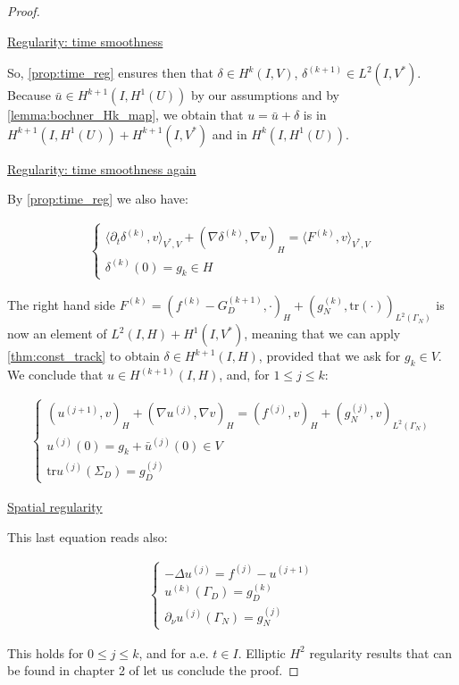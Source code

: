 \documentclass[english,a4paper,10pt,oneside]{scrbook}	%
\theoremstyle{break}
\newenvironment{mproof}[1][\proofname]{%
  \begin{proof}[#1]$ $\par\nobreak\ignorespaces
}{%
  \end{proof}
}
\renewcommand*{\proofname}{Proof}
\theoremstyle{remark}
\newcommand{\tr}{\text{tr}}
\begin{document}
\begin{appendices}
\begin{mproof}
\underline{Regularity: time smoothness}

So, \cref{prop:time_reg} ensures then that $\delta \in H^k(I,V)$, $\delta^{(k+1)} \in L^2(I,V^*)$. Because $\bar{u} \in H^{k+1}(I,H^1(U))$ by our assumptions and by \cref{lemma:bochner_Hk_map}, we obtain that $u = \bar{u} + \delta$ is in $H^{k+1}(I,H^1(U)) + H^{k+1}(I,V^*)$ and in $H^k(I,H^{1}(U))$.

\underline{Regularity: time smoothness again}

By \cref{prop:time_reg} we also have:

\begin{align*}
\left\{\begin{matrix}
\langle \partial_t \delta^{(k)},v\rangle_{V^*,V} + (\nabla \delta^{(k)}, \nabla v)_H = \langle F^{(k)}, v\rangle_{V^*,V} \\
\delta^{(k)}(0) = g_k \in H
\end{matrix}\right.
\end{align*}

The right hand side $F^{(k)} = (f^{(k)} - G^{(k+1)}_D, \cdot)_H +(g_N^{(k)}, \tr(\cdot))_{L^2(\Gamma_N)}$ is now an element of $L^2(I,H) + H^1(I,V^*)$, meaning that we can apply \cref{thm:const_track} to obtain $\delta \in H^{k+1}(I,H)$, provided that we ask for $g_k \in V$.
We conclude that $u \in H^{(k+1)}(I,H)$, and, for $1\leq j \leq k$:

\begin{align*}
	\left\{\begin{matrix}
(u^{(j+1)},v)_H + (\nabla u^{(j)}, \nabla v)_H = ( f^{(j)}, v)_H + (g_N^{(j)}, v)_{L^2(\Gamma_N)} \\
u^{(j)}(0) = g_k + \bar{u}^{(j)}(0)  \in V \\
\tr u^{(j)}(\Sigma_D) = g_D^{(j)}
\end{matrix}\right.
\end{align*}

\underline{Spatial regularity}

This last equation reads also:

\begin{align*}
\left\{\begin{matrix}
- \Delta  u^{(j)} = f^{(j)} - u^{(j+1)} \\
u^{(k)}(\Gamma_D) = g_D^{(k)} \\
\partial_\nu u^{(j)}(\Gamma_N) = g_N^{(j)}
\end{matrix}\right.
\end{align*}

This holds for $0\leq j \leq k$, and for a.e. $t \in I$.
Elliptic $H^2$ regularity results that can be found in chapter 2 of \cite{grisvard} let us conclude the proof.
\end{mproof}


\end{appendices}
\end{document}
